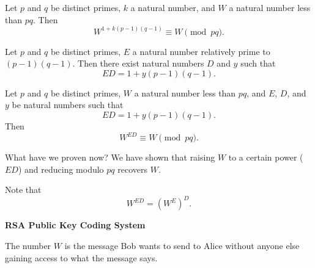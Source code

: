 \documentclass{article}
\theoremstyle{definition}
\newenvironment{manualtheorem}[1]{%
  \renewcommand{\thetheorem}{#1}%
  \theorem%
}{%
  \endtheorem%
}
\begin{document}
\begin{manualtheorem}{5.2}
	Let $p$ and $q$ be distinct primes, $k$ a natural number, and $W$ a natural number less than $pq$. Then
	\[
		W^{1 + k(p - 1)(q - 1)} \equiv W \pmod{pq}.
	\]
\end{manualtheorem}

\begin{manualtheorem}{5.3}
	Let $p$ and $q$ be distinct primes, $E$ a natural number relatively prime to $(p - 1)(q - 1)$. Then there exist natural numbers $D$ and $y$ such that
	\[
		ED = 1 + y(p - 1)(q - 1).
	\]
\end{manualtheorem}

\begin{manualtheorem}{5.4}
	Let $p$ and $q$ be distinct primes, $W$ a natural number less than $pq$, and $E$, $D$, and $y$ be natural numbers such that
	\[
		ED = 1 + y(p - 1)(q - 1).
	\]
	Then
	\[
		W^{ED} \equiv W \pmod{pq}.
	\]
\end{manualtheorem}

What have we proven now? We have shown that raising $W$ to a certain power ($ED$) and reducing modulo $pq$ recovers $W$.

Note that
\[
	W^{ED} = (W^{E})^{D}.
\]

\textbf{RSA Public Key Coding System}

\medskip

The number $W$ is the message Bob wants to send to Alice without anyone else gaining access to what the message says.
\end{document}
